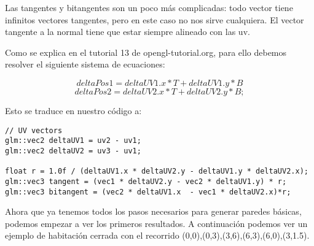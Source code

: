 Las tangentes y bitangentes son un poco más complicadas: todo vector tiene infinitos vectores tangentes, pero en este caso no nos sirve cualquiera. El vector tangente a la normal tiene que estar siempre alineado con las uv.

Como se explica en el tutorial 13 de opengl-tutorial.org, para ello debemos resolver el siguiente sistema de ecuaciones:


\[ deltaPos1 = deltaUV1.x * T + deltaUV1.y * B \]
\[ deltaPos2 = deltaUV2.x * T + deltaUV2.y * B;\]

Esto se traduce en nuestro código a:

\begin{lstlisting}
// UV vectors
glm::vec2 deltaUV1 = uv2 - uv1;
glm::vec2 deltaUV2 = uv3 - uv1;

float r = 1.0f / (deltaUV1.x * deltaUV2.y - deltaUV1.y * deltaUV2.x);
glm::vec3 tangent = (vec1 * deltaUV2.y - vec2 * deltaUV1.y) * r;
glm::vec3 bitangent = (vec2 * deltaUV1.x  - vec1 * deltaUV2.x)*r;
\end{lstlisting}

Ahora que ya tenemos todos los pasos necesarios para generar paredes básicas, podemos empezar a ver los primeros resultados. A continuación podemos ver un ejemplo de habitación cerrada con el recorrido (0,0),(0,3),(3,6),(6,3),(6,0),(3,1.5).
